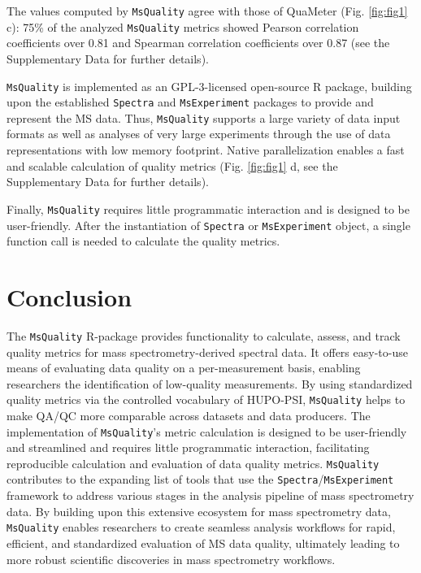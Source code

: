 \documentclass[unnumsec,webpdf,contemporary,large]{oup-authoring-template}%
\theoremstyle{thmstyleone}%
\theoremstyle{thmstyletwo}%
\theoremstyle{thmstylethree}%
\begin{document}
The values computed by \texttt{MsQuality}
agree with those of QuaMeter \citep{Ma2012} (Fig. \ref{fig:fig1} c): 
75\% of the analyzed \texttt{MsQuality} metrics showed Pearson correlation 
coefficients over 0.81 and Spearman correlation coefficients over 0.87
(see the Supplementary Data for further details).

\texttt{MsQuality} is implemented as an GPL-3-licensed open-source R package, 
building upon the established \texttt{Spectra} and \texttt{MsExperiment} packages
\citep{Rainer2022} to provide and represent the MS data. Thus, \texttt{MsQuality} 
supports a large variety of data input formats
as well as analyses of very large experiments through the use of data
representations with low memory footprint. Native parallelization enables a fast
and scalable calculation of quality metrics (Fig. \ref{fig:fig1} d, 
see the Supplementary Data for further details).

Finally, \texttt{MsQuality} requires little programmatic interaction and is designed to be
user-friendly.  After the instantiation of \texttt{Spectra} or \texttt{MsExperiment}
object, a single function call is needed to calculate the quality metrics.


\section{Conclusion}

The \texttt{MsQuality} R-package provides functionality to calculate, assess, 
and track quality metrics for mass spectrometry-derived spectral data. 
It offers easy-to-use means of evaluating data quality on a per-measurement 
basis, enabling researchers the identification of low-quality measurements.
By using standardized quality metrics via the controlled vocabulary of HUPO-PSI,
\texttt{MsQuality} helps to make QA/QC more comparable across datasets and 
data producers.
The implementation of \texttt{MsQuality}'s metric calculation is designed
to be user-friendly and streamlined and requires little programmatic 
interaction, facilitating reproducible calculation and evaluation of data 
quality metrics.
\texttt{MsQuality} contributes to the expanding list of 
tools that use the \texttt{Spectra}/\texttt{MsExperiment} framework 
\citep{Rainer2022} to address various stages in the analysis pipeline of 
mass spectrometry data. By building upon this extensive ecosystem for 
mass spectrometry data, 
\texttt{MsQuality} enables researchers to create seamless analysis workflows 
for rapid, efficient, and standardized evaluation of MS data quality, 
ultimately leading to more robust scientific discoveries in mass spectrometry
workflows.
\end{document}
